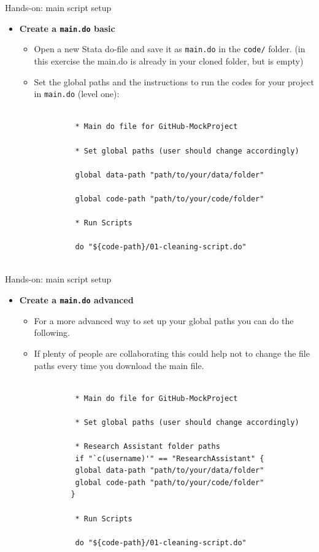 \documentclass[aspectratio=169]{beamer}
\begin{document}
\begin{frame}[fragile]{Hands-on: main script setup}
		\begin{itemize}
    \item \textbf{Create a \texttt{main.do} basic}
    \begin{itemize}
        \item Open a new Stata do-file and save it as \texttt{main.do} in the \texttt{code/} folder. (in this exercise the main.do is already in your cloned folder, but is empty)
        \item Set the global paths and the instructions to run the codes for your project in \texttt{main.do} (level one):
         \end{itemize}
\end{itemize}
		\begingroup
		\tiny
		\begin{verbatim}
			
                * Main do file for GitHub-MockProject
   
                * Set global paths (user should change accordingly)
                
                global data-path "path/to/your/data/folder"

                global code-path "path/to/your/code/folder"

                * Run Scripts 

                do "${code-path}/01-cleaning-script.do"
		
		\end{verbatim}
		\endgroup
	\end{frame}

 \begin{frame}[fragile]{Hands-on: main script setup}
		\begin{itemize}
    \item \textbf{Create a \texttt{main.do} advanced}
    \begin{itemize}
        \item For a more advanced way to set up your global paths you can do the following. 
        \item If plenty of people are collaborating this could help not to change the file paths every time you download the main file. 
         \end{itemize}
\end{itemize}
		\begingroup
		\tiny
		\begin{verbatim}
			
                * Main do file for GitHub-MockProject
   
                * Set global paths (user should change accordingly)
                
                * Research Assistant folder paths
                if "`c(username)'" == "ResearchAssistant" {
                global data-path "path/to/your/data/folder"
                global code-path "path/to/your/code/folder"
               }

                * Run Scripts 

                do "${code-path}/01-cleaning-script.do"
		
		\end{verbatim}
		\endgroup
	\end{frame}
\end{document}
